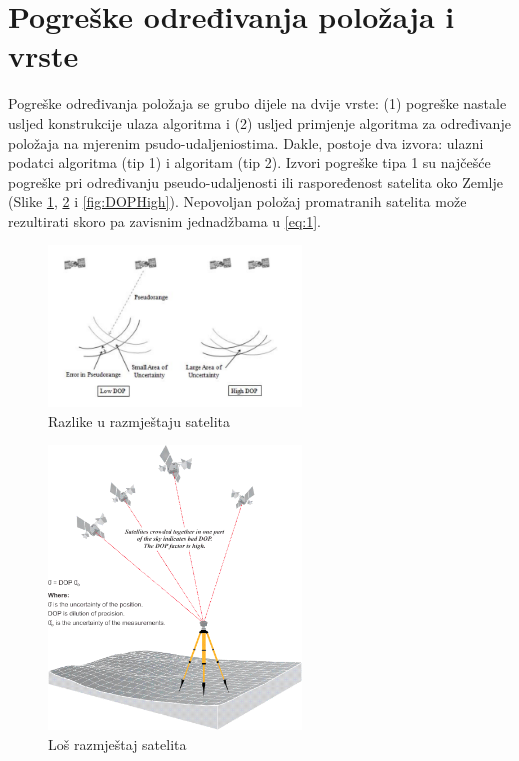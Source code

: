 \documentclass[a4paper,twoside,12pt]{memoir} %
\begin{document}
	\section{Pogreške određivanja položaja i vrste}\label{sec:pogreske}
	Pogreške određivanja položaja se grubo dijele na dvije vrste: (1)
	pogreške nastale usljed konstrukcije ulaza algoritma i
	(2) usljed primjenje algoritma za određivanje položaja na mjerenim psudo-udaljeniostima.
	Dakle, postoje dva izvora: ulazni podatci algoritma (tip 1) i algoritam (tip 2).
	Izvori pogreške tipa 1 su najčešće pogreške pri određivanju pseudo-udaljenosti
	ili raspoređenost satelita oko Zemlje (Slike \ref{fig:DOP}, \ref{fig:DOPLow} i \ref{fig:DOPHigh}).
	Nepovoljan položaj promatranih satelita može rezultirati skoro pa zavisnim jednadžbama
	u \ref{eq:1}.
	\begin{figure}[H]
		\centering
		\includegraphics[width=0.6\textwidth]{DOP}
		\caption{Razlike u razmještaju satelita}
		\label{fig:DOP}
	\end{figure}%
	\begin{figure}[H]
		\centering
		\includegraphics[width=0.6\textwidth]{DOPLow}
		\caption{Loš razmještaj satelita}
		\label{fig:DOPLow}
	\end{figure}%
\end{document}
